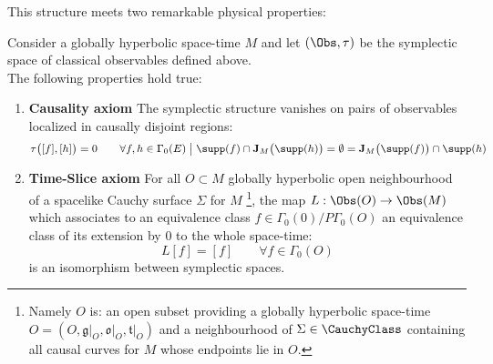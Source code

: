 \documentclass[Main]{subfiles}
\begin{document}
				This structure meets two remarkable physical properties:
				\begin{theorem}\label{Teo:CausalityTimeSliceAxioms}
					Consider a globally hyperbolic space-time $M$ and let $(\Obs,\tau)$ be the symplectic space of classical observables defined above.\\
					The following properties hold true:
					\begin{enumerate}
						\item\label{ItemCausAxiom} \textbf{Causality axiom}
							The symplectic structure vanishes on pairs of observables localized in causally disjoint regions:
							\begin{displaymath}
								\tau \big( [f],[h] \big) =0 \qquad
								\forall f,h \in \Gamma_0(E) \; \big\vert \; \supp(f) \cap \textbf{J}_M \big(\supp(h) \big) = \emptyset = 
								\textbf{J}_M \big(\supp(f) \big) \cap \supp(h)
							\end{displaymath}
						\item\label{ItemTimeSliceAxiom} \textbf{Time-Slice axiom}
							For all $O \subset M$ globally hyperbolic open neighbourhood of a spacelike Cauchy surface $\Sigma$ for $M$ \footnote{Namely $O$ is: an open subset providing a globally hyperbolic space-time $O = (O,\mathfrak{g}\vert_O,\mathfrak{o}\vert_O, \mathfrak{t}\vert_O)$ and a neighbourhood of $\Sigma \in \CauchyClass$ containing all causal curves for $M$ whose endpoints lie in $O$. },
							the map $L : \Obs( O) \rightarrow \Obs(M)$ which associates to an equivalence class $ f \in \Gamma_0(0)\big / P \Gamma_0(O)$ 
							an equivalence class of its extension by $0$ to the whole space-time:
							\begin{displaymath}
							 L[f] = [f] \qquad \forall f \in \Gamma_0(O)
							\end{displaymath}				
							is an isomorphism between symplectic spaces.
					\end{enumerate}
				\end{theorem}
\end{document}
